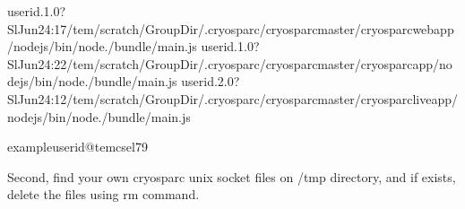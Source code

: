 \documentclass[a4paper,11pt,english]{sphinxmanual}
\begin{document}
\begin{sphinxVerbatim}[commandchars=\\\{\}]
userid.1.0?SlJun24:17/tem/scratch/\PYGZlt{}GroupDir\PYGZgt{}/.cryosparc/cryosparc\PYGZus{}master/cryosparc\PYGZus{}webapp/nodejs/bin/node./bundle/main.js
userid.1.0?SlJun24:22/tem/scratch/\PYGZlt{}GroupDir\PYGZgt{}/.cryosparc/cryosparc\PYGZus{}master/cryosparc\PYGZus{}app/nodejs/bin/node./bundle/main.js
userid.2.0?SlJun24:12/tem/scratch/\PYGZlt{}GroupDir\PYGZgt{}/.cryosparc/cryosparc\PYGZus{}master/cryosparc\PYGZus{}liveapp/nodejs/bin/node./bundle/main.js

exampleuserid@tem\PYGZhy{}cs\PYGZhy{}el7\PYGZdl{}\PYGZgt{}\PYGZhy{}9
\end{sphinxVerbatim}

\sphinxAtStartPar
Second, find your own cryosparc unix socket files on /tmp directory, and if exists, delete the files using rm command.
\end{document}
